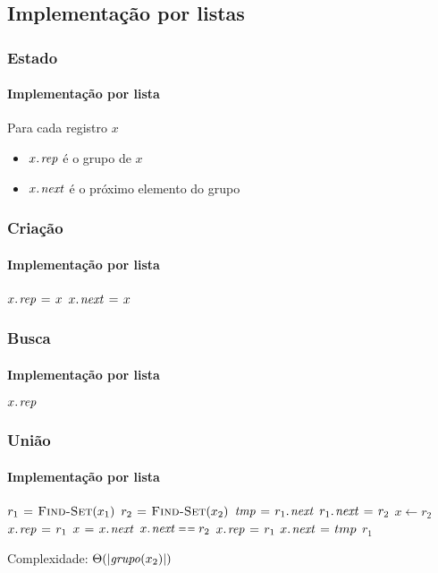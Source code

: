 \documentclass{beamer}
\begin{document}
\subsection{Implementação por listas}

\begin{frame}
\frametitle{Estado}
\framesubtitle{Implementação por lista}

Para cada registro $x$
\begin{itemize}
  \item $\attrib{x}{rep}$ é o grupo de $x$
  \item $\attrib{x}{next}$ é o próximo elemento do grupo
\end{itemize}
\end{frame}

\begin{frame}
\frametitle{Criação}
\framesubtitle{Implementação por lista}

\begin{codebox}
\li $\attrib{x}{rep} \gets x$
\li $\attrib{x}{next} \gets x$
\end{codebox}

\end{frame}

\begin{frame}
\frametitle{Busca}
\framesubtitle{Implementação por lista}

\begin{codebox}
\li \Return $\attrib{x}{rep}$
\end{codebox}

\end{frame}

\begin{frame}
\frametitle{União}
\framesubtitle{Implementação por lista}

\begin{codebox}
\li $r_1 \mathrel{\hspace{1pt}=\hspace{1pt}} \textnormal{\scshape Find-Set}(x_1)$
\li $r_2 \mathrel{\hspace{1pt}=\hspace{1pt}} \textnormal{\scshape Find-Set}(x_2)$
\li $\id{tmp} \gets \attrib{r_1}{next}$
\li $\attrib{r_1}{next} \gets r_2$
\li $x \gets r_2$
\li \Repeat
\li   $\attrib{x}{rep} \gets r_1$
\li   $x \gets \attrib{x}{next}$
\li \Until $\attrib{x}{next} \isequal r_2$
\li $\attrib{x}{rep} \gets r_1$
\li $\attrib{x}{next} \gets tmp$
\li \Return $r_1$
\end{codebox}
\pause
Complexidade: $\Theta( | \id{grupo}(x_2) |)$
\end{frame}
\end{document}
